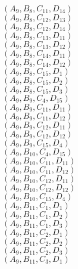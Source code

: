 \documentclass[14pt]{article}
\begin{document}
    $({A}_{9}, {B}_{8}, {C}_{11}, {D}_{14}) $ \\ 
    $({A}_{9}, {B}_{8}, {C}_{12}, {D}_{13}) $ \\ 
    $({A}_{9}, {B}_{8}, {C}_{12}, {D}_{14}) $ \\ 
    $({A}_{9}, {B}_{8}, {C}_{13}, {D}_{11}) $ \\ 
    $({A}_{9}, {B}_{8}, {C}_{13}, {D}_{12}) $ \\ 
    $({A}_{9}, {B}_{8}, {C}_{14}, {D}_{11}) $ \\ 
    $({A}_{9}, {B}_{8}, {C}_{14}, {D}_{12}) $ \\ 
    $({A}_{9}, {B}_{8}, {C}_{15}, {D}_{1}) $ \\ 
    $({A}_{9}, {B}_{8}, {C}_{15}, {D}_{2}) $ \\ 
    $({A}_{9}, {B}_{8}, {C}_{15}, {D}_{3}) $ \\ 
    $({A}_{9}, {B}_{9}, {C}_{4}, {D}_{15}) $ \\ 
    $({A}_{9}, {B}_{9}, {C}_{11}, {D}_{11}) $ \\ 
    $({A}_{9}, {B}_{9}, {C}_{11}, {D}_{12}) $ \\ 
    $({A}_{9}, {B}_{9}, {C}_{12}, {D}_{11}) $ \\ 
    $({A}_{9}, {B}_{9}, {C}_{12}, {D}_{12}) $ \\ 
    $({A}_{9}, {B}_{9}, {C}_{15}, {D}_{4}) $ \\ 
    $({A}_{9}, {B}_{10}, {C}_{4}, {D}_{15}) $ \\ 
    $({A}_{9}, {B}_{10}, {C}_{11}, {D}_{11}) $ \\ 
    $({A}_{9}, {B}_{10}, {C}_{11}, {D}_{12}) $ \\ 
    $({A}_{9}, {B}_{10}, {C}_{12}, {D}_{11}) $ \\ 
    $({A}_{9}, {B}_{10}, {C}_{12}, {D}_{12}) $ \\ 
    $({A}_{9}, {B}_{10}, {C}_{15}, {D}_{4}) $ \\ 
    $({A}_{9}, {B}_{11}, {C}_{1}, {D}_{1}) $ \\ 
    $({A}_{9}, {B}_{11}, {C}_{1}, {D}_{2}) $ \\ 
    $({A}_{9}, {B}_{11}, {C}_{1}, {D}_{3}) $ \\ 
    $({A}_{9}, {B}_{11}, {C}_{2}, {D}_{1}) $ \\ 
    $({A}_{9}, {B}_{11}, {C}_{2}, {D}_{2}) $ \\ 
    $({A}_{9}, {B}_{11}, {C}_{2}, {D}_{3}) $ \\ 
    $({A}_{9}, {B}_{11}, {C}_{3}, {D}_{1}) $ \\ 
\end{document}
